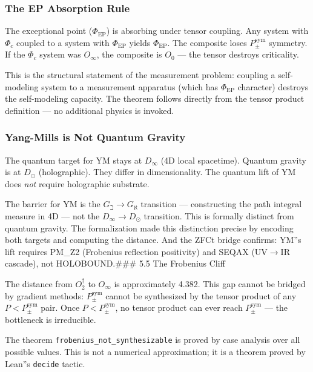 \documentclass[12pt,a4paper]{article}
\begin{document}
\subsubsection{The EP Absorption Rule}

The exceptional point ($\Phi_{\text{EP}}$) is absorbing under tensor coupling. Any system with $\Phi_c$ coupled to a system with $\Phi_{\text{EP}}$ yields $\Phi_{\text{EP}}$. The composite loses $P_{\pm}^{\text{sym}}$ symmetry. If the $\Phi_c$ system was $O_{\infty}$, the composite is $O_0$ --- the tensor destroys criticality.

This is the structural statement of the measurement problem: coupling a self-modeling system to a measurement apparatus (which has $\Phi_{\text{EP}}$ character) destroys the self-modeling capacity. The theorem follows directly from the tensor product definition --- no additional physics is invoked.

\subsubsection{Yang-Mills is Not Quantum Gravity}

The quantum target for YM stays at $D_{\infty}$ (4D local spacetime). Quantum gravity is at $D_{\odot}$ (holographic). They differ in dimensionality. The quantum lift of YM does \emph{not} require holographic substrate.

The barrier for YM is the $G_{\beth} \to G_{\aleph}$ transition --- constructing the path integral measure in 4D --- not the $D_{\infty} \to D_{\odot}$ transition. This is formally distinct from quantum gravity. The formalization made this distinction precise by encoding both targets and computing the distance. And the ZFCt bridge confirms: YM''s lift requires PM\_Z2 (Frobenius reflection positivity) and SEQAX (UV$\rightarrow$IR cascade), not HOLOBOUND.\#\#\# 5.5 The Frobenius Cliff

The distance from $O_2^\dagger$ to $O_{\infty}$ is approximately 4.382. This gap cannot be bridged by gradient methods: $P_{\pm}^{\text{sym}}$ cannot be synthesized by the tensor product of any $P < P_{\pm}^{\text{sym}}$ pair. Once $P < P_{\pm}^{\text{sym}}$, no tensor product can ever reach $P_{\pm}^{\text{sym}}$ --- the bottleneck is irreducible.

The theorem \texttt{frobenius\_not\_synthesizable} is proved by case analysis over all possible values. This is not a numerical approximation; it is a theorem proved by Lean''s \texttt{decide} tactic.
\end{document}
